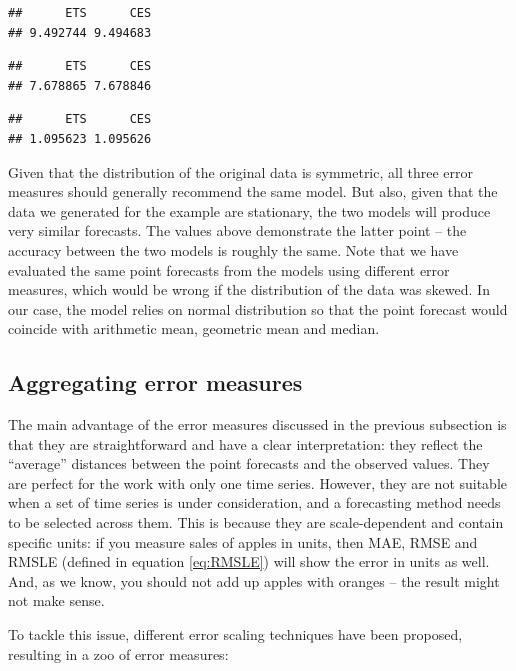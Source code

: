 \documentclass[
]{book}
\theoremstyle{definition}
\theoremstyle{definition}
\theoremstyle{definition}
\theoremstyle{definition}
\theoremstyle{remark}
\begin{document}
\begin{verbatim}
##      ETS      CES 
## 9.492744 9.494683
\end{verbatim}

\begin{verbatim}
##      ETS      CES 
## 7.678865 7.678846
\end{verbatim}

\begin{verbatim}
##      ETS      CES 
## 1.095623 1.095626
\end{verbatim}

Given that the distribution of the original data is symmetric, all three error measures should generally recommend the same model. But also, given that the data we generated for the example are stationary, the two models will produce very similar forecasts. The values above demonstrate the latter point -- the accuracy between the two models is roughly the same. Note that we have evaluated the same point forecasts from the models using different error measures, which would be wrong if the distribution of the data was skewed. In our case, the model relies on normal distribution so that the point forecast would coincide with arithmetic mean, geometric mean and median.

\hypertarget{errorMeasuresAggregate}{%
\subsection{Aggregating error measures}\label{errorMeasuresAggregate}}

The main advantage of the error measures discussed in the previous subsection is that they are straightforward and have a clear interpretation: they reflect the ``average'' distances between the point forecasts and the observed values. They are perfect for the work with only one time series. However, they are not suitable when a set of time series is under consideration, and a forecasting method needs to be selected across them. This is because they are scale-dependent and contain specific units: if you measure sales of apples in units, then MAE, RMSE and RMSLE (defined in equation \eqref{eq:RMSLE}) will show the error in units as well. And, as we know, you should not add up apples with oranges -- the result might not make sense.

To tackle this issue, different error scaling techniques have been proposed, resulting in a zoo of error measures:
\end{document}
